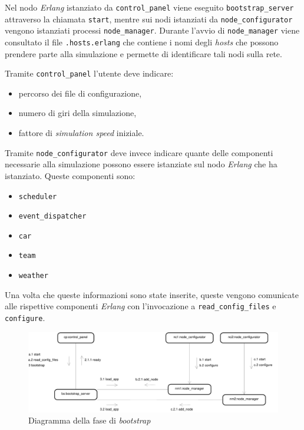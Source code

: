 \documentclass[a4paper]{report}
\newcommand{\Erlang}{\textsl{Erlang}}
\newcommand{\fun}[1]{\texttt{#1}}
\begin{document}
Nel nodo \Erlang{} istanziato da \texttt{control\_panel} viene eseguito \texttt{bootstrap\_server} attraverso la chiamata \fun{start}, mentre sui nodi istanziati da \texttt{node\_configurator} vengono istanziati processi \texttt{node\_manager}. Durante l'avvio di \texttt{node\_manager} viene consultato il file \texttt{.hosts.erlang} che contiene i nomi degli \textit{hosts} che possono prendere parte alla simulazione e permette di identificare tali nodi sulla rete.

Tramite \texttt{control\_panel} l'utente deve indicare:
\begin{itemize}
\item percorso dei file di configurazione,
\item numero di giri della simulazione,
\item fattore di \textit{simulation speed} iniziale.
\end{itemize}

Tramite \texttt{node\_configurator} deve invece indicare quante delle componenti necessarie alla simulazione possono essere istanziate sul nodo \Erlang{} che ha istanziato. Queste componenti sono:
\begin{itemize}
\item \texttt{scheduler}
\item \texttt{event\_dispatcher}
\item \texttt{car}
\item \texttt{team}
\item \texttt{weather}
\end{itemize}

Una volta che queste informazioni sono state inserite, queste vengono comunicate alle rispettive componenti \Erlang{} con l'invocazione a \fun{read\_config\_files} e \fun{configure}.

\begin{landscape}
\begin{figure}
\includegraphics[height=.24\paperheight]{diagrammi/Bootstrap}
\caption{Diagramma della fase di \textit{bootstrap}}
\label{fig:bootstrap}
\end{figure}
\end{landscape}
\end{document}
